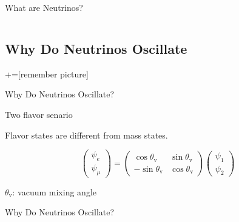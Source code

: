 \documentclass[9pt]{beamer}
\begin{document}
\begin{darkframes}
\begin{frame}{What are Neutrinos?}
\begin{minipage}[\textheight]{\textwidth}
\begin{columns}[T]
      \end{columns}
      \end{minipage}

    \end{frame}



\subsection{Why Do Neutrinos Oscillate}

+=[remember picture]

\everymath{\displaystyle}


\begin{frame}{Why Do Neutrinos Oscillate?}

\begin{tcolorbox}[box align=center,halign=center,valign=center, standard jigsaw,opacityback=0, coltext=white]
   Two flavor senario
\end{tcolorbox}

Flavor states are different from mass states.

\begin{equation*}
\begin{pmatrix}
\psi_e\\
\psi_\mu
\end{pmatrix} = \begin{pmatrix}
\cos \theta_{\mathrm v} & \sin\theta_{\mathrm v} \\
-\sin \theta_{\mathrm v} & \cos \theta_{\mathrm v}
\end{pmatrix}\begin{pmatrix}
\psi_1\\
\psi_2
\end{pmatrix}
\end{equation*}


$\theta_{\mathrm v}$: vacuum mixing angle

\end{frame}



\begin{frame}[fragile]{Why Do Neutrinos Oscillate?}






\end{frame}
\end{darkframes}
\end{document}
